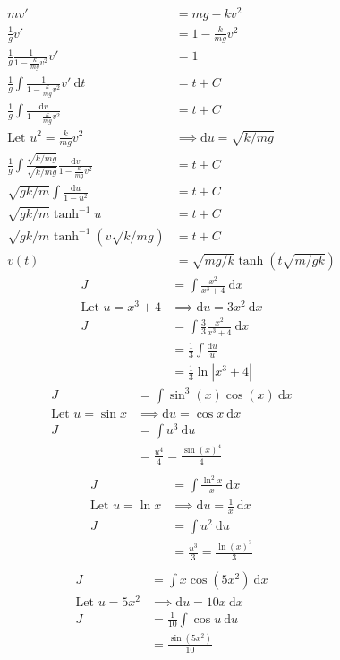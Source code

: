 \documentclass[a4paper,11pt]{article}
\theoremstyle{plain}
\theoremstyle{definition}
\begin{document}
\begin{align*}
	mv' &= mg - kv^2 \\
	\frac{1}{g} v' &= 1 - \frac{k}{mg}v^2 \\
	\frac{1}{g}\frac{1}{1 - \frac{k}{mg}v^2} v' &= 1 \\
	\frac{1}{g}\int \frac{1}{1 - \frac{k}{mg}v^2} v'\ \text{d}t &= t+C \\
	\frac{1}{g}\int \frac{\text{d}v}{1 - \frac{k}{mg}v^2}  &= t+C \\
	\text{Let } u^2 = \frac{k}{mg}v^2 &\implies \text{d}u = \sqrt{k/mg} \\
	\frac{1}{g}\int\frac{\sqrt{k/mg}}{\sqrt{k/mg}} \frac{\text{d}v}{1 - 
	\frac{k}{mg}v^2}  &= t+C \\
	\sqrt{gk/m}\int \frac{\text{d}u}{1-u^2}&=t+C \\
	\sqrt{gk/m} \tanh^{-1} u&=t+C \\
	\sqrt{gk/m} \tanh^{-1}{\left(v\sqrt{k/mg}\right)} &=t+C \\
	v(t) &= \sqrt{mg/k} \tanh{\left(t\sqrt{m/gk}\right)} 
\end{align*}
\begin{align*}
	J&=\int \frac{x^2}{x^3+4}\ \text{d}x \\
	\text{Let } u = x^3+4 &\implies \text{d}u = 3x^2\ \text{d}x \\
	J&=\int \frac{3}{3}\frac{x^2}{x^3+4}\ \text{d}x \\
	 &=\frac{1}{3}\int \frac{\text{d}u}{u} \\
	 &=\frac{1}{3} \ln{\left|x^3+4\right|}
\end{align*}
\begin{align*}
	J&=\int \sin^3 (x)\cos(x)\ \text{d}x \\
	\text{Let } u = \sin x &\implies \text{d}u = \cos x\ \text{d}x \\
	J&=\int u^3\ \text{d}u \\
	 &=\frac{u^4}{4} = \frac{\sin{(x)}^4}{4} \\
\end{align*}
\begin{align*}
	J&=\int \frac{\ln^2 x}{x}\ \text{d}x \\
	\text{Let } u = \ln x &\implies \text{d}u = \frac{1}{x}\ \text{d}x \\
	J&=\int u^2\ \text{d}u \\
	 &=\frac{u^3}{3} = \frac{\ln{(x)}^3}{3} \\
\end{align*}
\begin{align*}
	J&=\int x \cos{\left(5x^2\right)}\ \text{d}x \\
	\text{Let } u = 5x^2 &\implies \text{d}u = 10x\ \text{d}x \\
	J&=\frac{1}{10}\int \cos u\ \text{d}u \\
	 &= \frac{\sin{\left(5x^2\right)}}{10} 
\end{align*}
\end{document}
